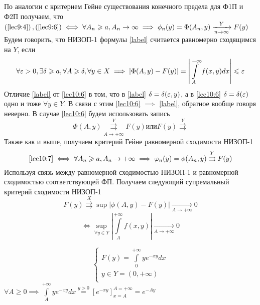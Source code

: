 \documentclass[a4paper,12pt,openany]{report}
\begin{document}
По аналогии с критерием Гейне существования конечного предела для Ф1П и Ф2П 
получаем, что 
$\left(\eqref{lec9:4}\right),\left(\eqref{lec9:6}\right) \iff \forall A_n \ge 
a, A_n \to \infty \implies \phi_n(y) =\Phi(A_n,y) \xrightarrow[n\rightarrow 
\infty]{Y}F(y) $
Будем говорить, что НИЗОП-1 формулы \eqref{label}  считается 
равномерно сходящимся на $Y$, если
\begin{equation}
\label{lec10:6}
\forall \eps > 0, \exists \delta \ge a, \forall A \ge \delta, \forall y\in X 
\implies \left| \Phi(A,y) - F(y) \right| = \left| \int\limits_A^{+\infty} 
f(x,y) dx \right| \le \eps
\end{equation}
Отличие \eqref{label} от \eqref{lec10:6} в том, что в \eqref{label} $\delta = 
\delta(\eps,y)$, а в \eqref{lec10:6} $\delta = \delta(\eps)$ одно и тоже 
$\forall y \in Y$. В связи с этим \eqref{lec10:6} $\implies$ \eqref{label}, 
обратное вообще говоря неверно. 
В случае \eqref{lec10:6} будем использовать запись \begin{equation}
\label{lec10:7}
\Phi(A,y)\overset{Y}{\underset{A \to +\infty}{\rightrightarrows}}F(y) или 
F(y)\overset{Y}{\rightrightarrows}
\end{equation}
Также как и выше, получаем критерий Гейне равномерной сходимости НИЗОП-1 
\begin{equation}
\label{lec10:8}
 \eqref{lec10:7} \iff \forall A_n \ge a, A_n\rightarrow +\infty \implies 
 \varphi_n(y) = \phi(A_n,y) \overset{Y}\rightrightarrows F(y) 
\end{equation}
Используя связь между равномерной сходимостью НИЗОП-1 и равномерной 
сходимостью соответствующей ФП. Получаем следующий супремальный критерий 
сходимости НИЗОП-1 
\begin{equation}
\label{lec10:9}
F(y)\overset{X} \rightrightarrows \sup\left|\phi(A , y) - F(y) \right| 
\underset{A \to + \infty}\to 0 \end{equation}
\begin{equation}
\label{lec10:10}\iff \underset{\forall y \in 
Y}\sup\left|\int\limits_A^{+\infty} f(x,y)\right| \underset{A \to + \infty} 
\to 0  \end{equation}

\[ \left\{\begin{array}{rcl}
		F(y)=\int\limits_0^{+\infty}ye^{-xy}dx\\
		y \in Y = (0,+\infty)\\
		\end{array}
		\right. \]
$\forall A \ge 0 \implies \int\limits_A^{+\infty}ye^{-xy}dx \overset{y > 0} = 
\left[e^{-xy} \right]_{x = A}^{A = +\infty} = e^{-Ay} $
\end{document}
